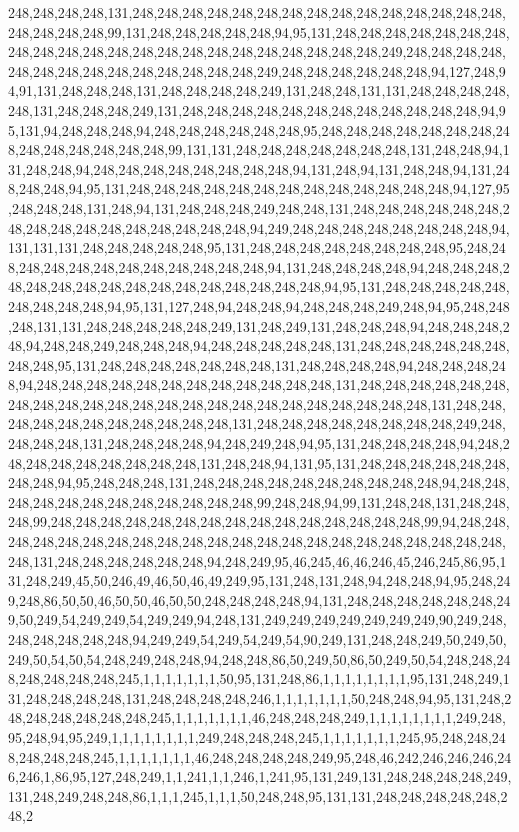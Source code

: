 248,248,248,248,131,248,248,248,248,248,248,248,248,248,248,248,248,248,248,248,248,248,248,248,99,131,248,248,248,248,248,94,95,131,248,248,248,248,248,248,248,248,248,248,248,248,248,248,248,248,248,248,248,248,248,248,249,248,248,248,248,248,248,248,248,248,248,248,248,248,248,249,248,248,248,248,248,248,94,127,248,94,91,131,248,248,248,131,248,248,248,248,249,131,248,248,131,131,248,248,248,248,248,131,248,248,248,249,131,248,248,248,248,248,248,248,248,248,248,248,248,94,95,131,94,248,248,248,94,248,248,248,248,248,248,95,248,248,248,248,248,248,248,248,248,248,248,248,248,248,99,131,131,248,248,248,248,248,248,248,131,248,248,94,131,248,248,94,248,248,248,248,248,248,248,248,94,131,248,94,131,248,248,94,131,248,248,248,94,95,131,248,248,248,248,248,248,248,248,248,248,248,248,248,94,127,95,248,248,248,131,248,94,131,248,248,248,249,248,248,131,248,248,248,248,248,248,248,248,248,248,248,248,248,248,248,248,94,249,248,248,248,248,248,248,248,248,94,131,131,131,248,248,248,248,248,95,131,248,248,248,248,248,248,248,248,95,248,248,248,248,248,248,248,248,248,248,248,248,94,131,248,248,248,248,94,248,248,248,248,248,248,248,248,248,248,248,248,248,248,248,248,94,95,131,248,248,248,248,248,248,248,248,248,94,95,131,127,248,94,248,248,94,248,248,248,249,248,94,95,248,248,248,131,131,248,248,248,248,248,249,131,248,249,131,248,248,248,94,248,248,248,248,94,248,248,249,248,248,248,94,248,248,248,248,248,131,248,248,248,248,248,248,248,248,95,131,248,248,248,248,248,248,248,131,248,248,248,248,94,248,248,248,248,94,248,248,248,248,248,248,248,248,248,248,248,248,131,248,248,248,248,248,248,248,248,248,248,248,248,248,248,248,248,248,248,248,248,248,248,248,131,248,248,248,248,248,248,248,248,248,248,248,131,248,248,248,248,248,248,248,248,249,248,248,248,248,131,248,248,248,248,94,248,249,248,94,95,131,248,248,248,248,94,248,248,248,248,248,248,248,248,248,131,248,248,94,131,95,131,248,248,248,248,248,248,248,248,94,95,248,248,248,131,248,248,248,248,248,248,248,248,248,248,94,248,248,248,248,248,248,248,248,248,248,248,248,99,248,248,94,99,131,248,248,131,248,248,248,99,248,248,248,248,248,248,248,248,248,248,248,248,248,248,248,99,94,248,248,248,248,248,248,248,248,248,248,248,248,248,248,248,248,248,248,248,248,248,248,248,131,248,248,248,248,248,248,94,248,249,95,46,245,46,46,246,45,246,245,86,95,131,248,249,45,50,246,49,46,50,46,49,249,95,131,248,131,248,94,248,248,94,95,248,249,248,86,50,50,46,50,50,46,50,50,248,248,248,248,94,131,248,248,248,248,248,248,249,50,249,54,249,249,54,249,249,94,248,131,249,249,249,249,249,249,249,90,249,248,248,248,248,248,248,94,249,249,54,249,54,249,54,90,249,131,248,248,249,50,249,50,249,50,54,50,54,248,249,248,248,94,248,248,86,50,249,50,86,50,249,50,54,248,248,248,248,248,248,248,245,1,1,1,1,1,1,1,50,95,131,248,86,1,1,1,1,1,1,1,1,95,131,248,249,131,248,248,248,248,131,248,248,248,248,246,1,1,1,1,1,1,1,50,248,248,94,95,131,248,248,248,248,248,248,248,245,1,1,1,1,1,1,1,46,248,248,248,249,1,1,1,1,1,1,1,1,249,248,95,248,94,95,249,1,1,1,1,1,1,1,1,249,248,248,248,245,1,1,1,1,1,1,1,245,95,248,248,248,248,248,248,245,1,1,1,1,1,1,1,46,248,248,248,248,249,95,248,46,242,246,246,246,246,246,1,86,95,127,248,249,1,1,241,1,1,246,1,241,95,131,249,131,248,248,248,248,249,131,248,249,248,248,86,1,1,1,245,1,1,1,50,248,248,95,131,131,248,248,248,248,248,248,2